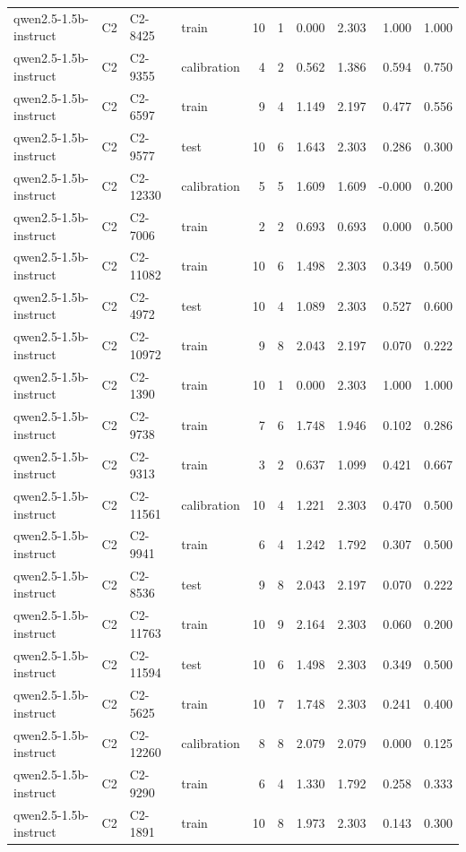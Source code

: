 \begin{table}
\begin{tabular}{llllrrrrrr}
qwen2.5-1.5b-instruct & C2 & C2-8425 & train & 10 & 1 & 0.000 & 2.303 & 1.000 & 1.000 \\
qwen2.5-1.5b-instruct & C2 & C2-9355 & calibration & 4 & 2 & 0.562 & 1.386 & 0.594 & 0.750 \\
qwen2.5-1.5b-instruct & C2 & C2-6597 & train & 9 & 4 & 1.149 & 2.197 & 0.477 & 0.556 \\
qwen2.5-1.5b-instruct & C2 & C2-9577 & test & 10 & 6 & 1.643 & 2.303 & 0.286 & 0.300 \\
qwen2.5-1.5b-instruct & C2 & C2-12330 & calibration & 5 & 5 & 1.609 & 1.609 & -0.000 & 0.200 \\
qwen2.5-1.5b-instruct & C2 & C2-7006 & train & 2 & 2 & 0.693 & 0.693 & 0.000 & 0.500 \\
qwen2.5-1.5b-instruct & C2 & C2-11082 & train & 10 & 6 & 1.498 & 2.303 & 0.349 & 0.500 \\
qwen2.5-1.5b-instruct & C2 & C2-4972 & test & 10 & 4 & 1.089 & 2.303 & 0.527 & 0.600 \\
qwen2.5-1.5b-instruct & C2 & C2-10972 & train & 9 & 8 & 2.043 & 2.197 & 0.070 & 0.222 \\
qwen2.5-1.5b-instruct & C2 & C2-1390 & train & 10 & 1 & 0.000 & 2.303 & 1.000 & 1.000 \\
qwen2.5-1.5b-instruct & C2 & C2-9738 & train & 7 & 6 & 1.748 & 1.946 & 0.102 & 0.286 \\
qwen2.5-1.5b-instruct & C2 & C2-9313 & train & 3 & 2 & 0.637 & 1.099 & 0.421 & 0.667 \\
qwen2.5-1.5b-instruct & C2 & C2-11561 & calibration & 10 & 4 & 1.221 & 2.303 & 0.470 & 0.500 \\
qwen2.5-1.5b-instruct & C2 & C2-9941 & train & 6 & 4 & 1.242 & 1.792 & 0.307 & 0.500 \\
qwen2.5-1.5b-instruct & C2 & C2-8536 & test & 9 & 8 & 2.043 & 2.197 & 0.070 & 0.222 \\
qwen2.5-1.5b-instruct & C2 & C2-11763 & train & 10 & 9 & 2.164 & 2.303 & 0.060 & 0.200 \\
qwen2.5-1.5b-instruct & C2 & C2-11594 & test & 10 & 6 & 1.498 & 2.303 & 0.349 & 0.500 \\
qwen2.5-1.5b-instruct & C2 & C2-5625 & train & 10 & 7 & 1.748 & 2.303 & 0.241 & 0.400 \\
qwen2.5-1.5b-instruct & C2 & C2-12260 & calibration & 8 & 8 & 2.079 & 2.079 & 0.000 & 0.125 \\
qwen2.5-1.5b-instruct & C2 & C2-9290 & train & 6 & 4 & 1.330 & 1.792 & 0.258 & 0.333 \\
qwen2.5-1.5b-instruct & C2 & C2-1891 & train & 10 & 8 & 1.973 & 2.303 & 0.143 & 0.300 \\

\end{tabular}
\end{table}
